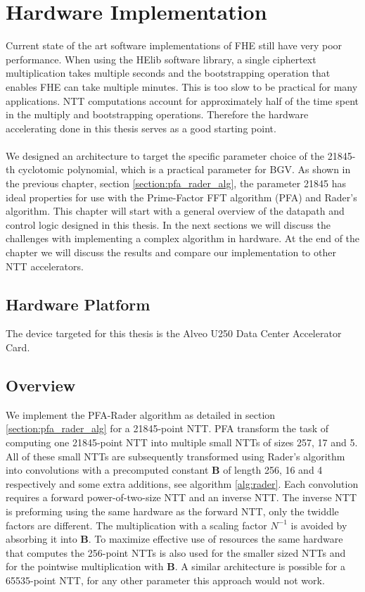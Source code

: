 \documentclass[english,master=eelt,masteroption=ec]{kulemt}
\begin{document}
\chapter{Hardware Implementation}
\label{chapter:hardware_implementation}

Current state of the art software implementations of FHE still have very poor performance. When using the HElib software library, a single ciphertext multiplication takes multiple seconds and the bootstrapping operation that enables FHE can take multiple minutes. \cite{cryptoeprint:2018/244} This is too slow to be practical for many applications. NTT computations account for approximately half of the time spent in the multiply and bootstrapping operations.  Therefore the hardware accelerating done in this thesis serves as a good starting point.
\\\\
 We designed an architecture to target the specific parameter choice of the 21845-th cyclotomic polynomial, which is a practical parameter for BGV. As shown in the previous chapter, section \ref{section:pfa_rader_alg}, the parameter 21845 has ideal properties for use with the Prime-Factor FFT algorithm (PFA) and Rader’s algorithm. This chapter will start with a general overview of the datapath and control logic designed in this thesis. In the next sections we will discuss the challenges with implementing a complex algorithm in hardware. At the end of the chapter we will discuss the results and compare our implementation to other NTT accelerators.

\section{Hardware Platform}
The device targeted for this thesis is the Alveo U250 Data Center Accelerator Card. 

\section{Overview}

We implement the PFA-Rader algorithm as detailed in section \ref{section:pfa_rader_alg} for a 21845-point NTT. PFA transform the task of computing one 21845-point NTT into multiple small NTTs of sizes 257, 17 and 5. All of these small NTTs are subsequently transformed using Rader's algorithm into convolutions with a precomputed constant $\mathbf{B}$ of length 256, 16 and 4 respectively and some extra additions, see algorithm \ref{alg:rader}. Each convolution requires a forward power-of-two-size NTT and an inverse NTT. The inverse NTT is preforming using the same hardware as the forward NTT, only the twiddle factors are different. The multiplication with a scaling factor $N^{-1}$ is avoided by absorbing it into $\mathbf{B}$. To maximize effective use of resources the same hardware that computes the 256-point NTTs is also used for the smaller sized NTTs and for the pointwise multiplication with $\mathbf{B}$. A similar architecture is possible for a 65535-point NTT, for any other parameter this approach would not work.
\\\\
\end{document}
